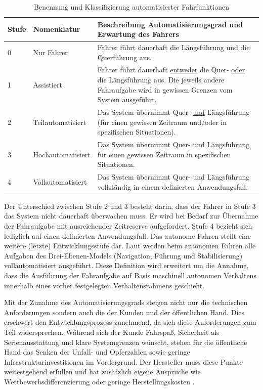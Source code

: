 \begin{table}[htpb]
	\scriptsize
	\caption[Benennung und Klassifizierung automatisierter Fahrfunktionen]{Benennung und Klassifizierung automatisierter Fahrfunktionen \parencite[S. 3]{Gasser.2011}}\label{tab:Automatisierungsgrad}
	\centering
	\begin{tabular}{l p{3cm} p{10cm}}
		\toprule
		Stufe & Nomenklatur & Beschreibung Automatisierungsgrad und Erwartung des Fahrers \\
		\midrule
		0 & Nur Fahrer & Fahrer führt dauerhaft die Längsführung und die Querführung aus. \\
		1 & Assistiert & Fahrer führt dauerhaft \underline{entweder} die Quer- \underline{oder} die Längsführung aus. Die jeweils andere Fahraufgabe wird in gewissen Grenzen vom System ausgeführt. \\
		2 & Teilautomatisiert & Das System übernimmt Quer- \underline{und} Längsführung (für einen gewissen Zeitraum und/oder in spezifischen Situationen). \\
		3 & Hochautomatisiert & Das System übernimmt Quer- und Längsführung für einen gewissen Zeitraum in spezifischen Situationen. \\
		4 & Vollautomatisiert & Das System übernimmt Quer- und Längsführung vollständig in einem definierten Anwendungsfall. \\
		\bottomrule
	\end{tabular}
\end{table}

Der Unterschied zwischen Stufe 2 und 3 besteht darin, dass der Fahrer in Stufe 3 das System nicht dauerhaft überwachen muss. Er wird bei Bedarf zur Übernahme der Fahraufgabe mit ausreichender Zeitreserve aufgefordert. Stufe 4 bezieht sich lediglich auf einen definierten Anwendungsfall. Das autonome Fahren stellt eine weitere (letzte) Entwicklungsstufe dar. Laut \Textcite[S. 34]{Maurer.2015} werden beim autonomen Fahren alle Aufgaben des Drei-Ebenen-Models (Navigation, Führung und Stabilisierung) vollautomatisiert ausgeführt. Diese Definition wird erweitert um die Annahme, dass die Ausführung der Fahraufgabe auf Basis maschinell autonomen Verhaltens innerhalb eines vorher festgelegten Verhaltensrahmens geschieht.

Mit der Zunahme des Automatisierungsgrads steigen nicht nur die technischen Anforderungen sondern auch die der Kunden und der öffentlichen Hand. Dies erschwert den Entwicklungsprozess zunehmend, da sich diese Anforderungen zum Teil widersprechen. Während sich der Kunde Fahrspaß, Sicherheit als Serienausstattung und klare Systemgrenzen wünscht, stehen für die öffentliche Hand das Senken der Unfall- und Opferzahlen sowie geringe Infrastrukturinvestitionen im Vordergrund. Der Hersteller muss diese Punkte weitestgehend erfüllen und hat zusätzlich eigene Ansprüche wie Wettbewerbsdifferenzierung oder geringe Herstellungskosten \parencite[S. 8]{Meitinger.2008}. %

